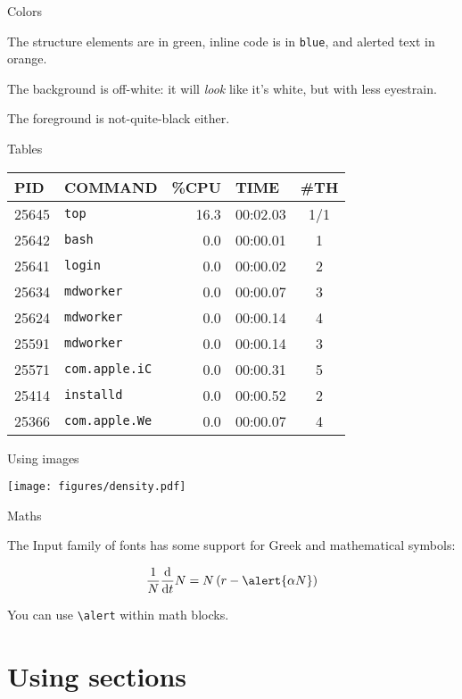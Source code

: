 \documentclass[11pt, compress, aspectratio=1610]{beamer}
\let\OldTexttt\texttt
\renewcommand{\texttt}[1]{\OldTexttt{\color{plTT}#1}}
\begin{document}
\begin{frame}[fragile]{Colors}

The structure elements are in green, inline code is in \texttt{blue},
and alerted text in \alert{orange}.

The background is off-white: it will \emph{look} like it's white, but
with less eyestrain.

The foreground is not-quite-black either.

\end{frame}

\begin{frame}[fragile]{Tables}

\begin{longtable}[]{@{}llrlc@{}}
\toprule
PID & COMMAND & \%CPU & TIME & \#TH\tabularnewline
\midrule
\endhead
25645 & \texttt{top} & 16.3 & 00:02.03 & 1/1\tabularnewline
25642 & \texttt{bash} & 0.0 & 00:00.01 & 1\tabularnewline
25641 & \texttt{login} & 0.0 & 00:00.02 & 2\tabularnewline
25634 & \texttt{mdworker} & 0.0 & 00:00.07 & 3\tabularnewline
25624 & \texttt{mdworker} & 0.0 & 00:00.14 & 4\tabularnewline
25591 & \texttt{mdworker} & 0.0 & 00:00.14 & 3\tabularnewline
25571 & \texttt{com.apple.iC} & 0.0 & 00:00.31 & 5\tabularnewline
25414 & \texttt{installd} & 0.0 & 00:00.52 & 2\tabularnewline
25366 & \texttt{com.apple.We} & 0.0 & 00:00.07 & 4\tabularnewline
\bottomrule
\end{longtable}

\end{frame}

\begin{frame}{Using images}

\texttt{[image: figures/density.pdf]}

\end{frame}

\begin{frame}[fragile]{Maths}

The Input family of fonts has some support for Greek and mathematical
symbols:

\[
\frac{1}{N}\frac{\text{d}}{\text{d}t}N = N\left(r-\alert{\alpha N}\right)
\]

You can use \texttt{\textbackslash{}alert} within math blocks.

\end{frame}

\section{Using sections}\label{using-sections}
\end{document}
